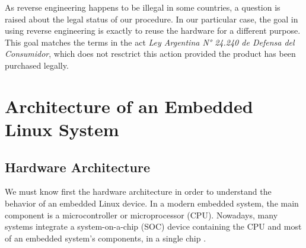 \documentclass[conference]{IEEEtran}
\newcommand{\nota}[1]{}
\begin{document}
\nota{Esto plantea la inquietud acerca de la legalidad 
del proceso, debido a las posibles restricciones en las licencias de uso de cada producto
específico. En este caso en particular, sólo se usa ingeniería inversa para poder
reutilizar el hardware con un propósito diferente, lo cual es acorde con las Ley
Argentina N° 24.240 de Defensa del Consumidor (referencia :),
http://www.infoleg.gov.ar/infolegInternet/anexos/0-4999/638/texact.htm),
siempre que el producto haya sido adquirido legalmente.}

As reverse engineering happens to be illegal in some countries, a question is raised 
about the legal status of our procedure. In our particular case, the goal in using 
reverse engineering is exactly to reuse the hardware for a different purpose. This goal
matches the terms in the act \emph{Ley Argentina N° 24.240 de Defensa del Consumidor}, which 
does not resctrict this action provided the product has been purchased legally.



\section{Architecture of an Embedded Linux System}
\subsection{Hardware Architecture}

\nota{Para entender el funcionamiento de un dispositivo Linux embebido, es necesario, en primer lugar, conocer
la arquitectura de hardware. En un sistema embebido moderno la arquitectura
contiene como componente central, un microcontrolador o microprocesador (CPU).
Mas aún, actualmente, muchos sistemas contienen un SOC (del inglés ``system on chip''),
que contiene la CPU y gran parte de los componentes de un sistema embebido, en un
único chip \cite{arm}.
}

We must know first the hardware architecture in order to understand the behavior of an embedded Linux device. In a modern embedded system, the main component is a microcontroller or microprocessor (CPU). Nowadays, many systems integrate a system-on-a-chip (SOC) device containing the CPU and most of an embedded system's components, in a single chip \cite{arm}.


\nota {Además, es de interés conocer cuáles otros componentes conforman
el sistema. Los mas importantes, luego de conocer la CPU,
son los módulos de memoria (de
tipo RAM y de tipo Flash), y los módulos de comunicaciones (serial, usb, etc).
Ya que, en conjunto con el microprocesador, suelen dar una visión
global de cómo inicia o funciona el sistema.
}
\end{document}
